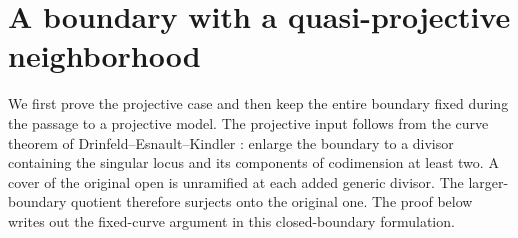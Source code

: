 \section{A boundary with a quasi-projective neighborhood}
We first prove the projective case and then keep the entire boundary
fixed during the passage to a projective model.
The projective input follows from the curve theorem of
Drinfeld--Esnault--Kindler \cite[Lemma C.2, p.~19]{Drinfeld}
\cite[Proposition 6.2, pp.~8--9]{EsnaultKindler}: enlarge the boundary
to a divisor containing the singular locus and its components of
codimension at least two. A cover of the original open is unramified
at each added generic divisor. The larger-boundary quotient therefore
surjects onto the original one. The proof below writes out the fixed-curve
argument in this closed-boundary formulation.

